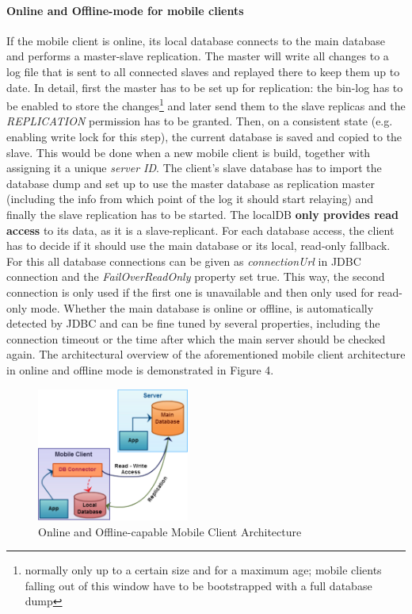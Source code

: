 \documentclass[twoside,colorbacktitle,accentcolor=tud1b]{tudexercise}
\begin{document}
\paragraph{Online and Offline-mode for mobile clients}
If the mobile client is online, its local database connects to the main database and performs a master-slave replication.
The master will write all changes to a log file that is sent to all connected slaves and replayed there to keep them up to date.
In detail, first the master has to be set up for replication: the bin-log has to be enabled to store the changes\footnote{normally only up to a certain size and for a maximum age; mobile clients falling out of this window have to be bootstrapped with a full database dump} and later send them to the slave replicas and the \textit{REPLICATION} permission has to be granted. 
Then, on a consistent state (e.g. enabling write lock for this step), the current database is saved and copied to the slave.
This would be done when a new mobile client is build, together with assigning it a unique \textit{server ID}.
The client's slave database has to import the database dump and set up to use the master database as replication master (including the info from which point of the log it should start relaying) and finally the slave replication has to be started.
The \ac{localDB} \textbf{only provides read access} to its data, as it is a slave-replicant.
For each database access, the client has to decide if it should use the main database or its local, read-only fallback.
For this all database connections can be given as \textit{connectionUrl} in JDBC connection and the \textit{FailOverReadOnly} property set true. \newpage
This way, the second connection is only used if the first one is unavailable and then only used for read-only mode.
Whether the main database is online or offline, is automatically detected by JDBC and can be fine tuned by several properties, including the connection timeout or the time after which the main server should be checked again. The architectural overview of the aforementioned mobile client architecture in online and offline mode is demonstrated in Figure 4.

\begin{figure}[h!]
  \centering
   \includegraphics[width=50mm]{ServerMobileClientCommunication}
   \caption{Online and Offline-capable Mobile Client Architecture}
\end{figure}
\end{document}
